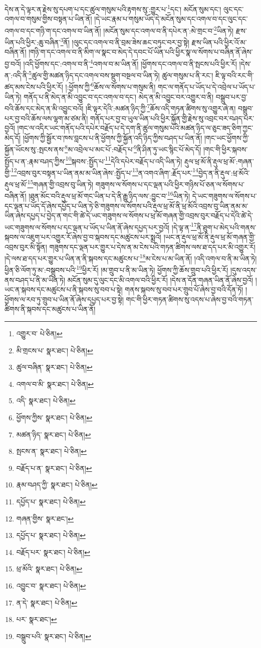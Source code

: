 དེས་ན་དེ་ལྟར་ན་རྗེས་སུ་དཔག་པ་དང་ཚུལ་གསུམ་པའི་རྟགས་སུ་:གྱུར་པ་\footnote{འགྱུར་བ་  པེ་ཅིན། }དང་། མངོན་སུམ་དང་། ལུང་དང་འགལ་བ་གསུམ་གྱིས་བསྟན་པ་ཡིན་ནོ། །དེ་ཡང་རྣམ་པ་གསུམ་ཡོད་དེ་མངོན་སུམ་དང་འགལ་བ་དང་ལུང་དང་འགལ་བ་དང་གཉི་ག་དང་འགལ་བ་ཡིན་ནོ། །མངོན་སུམ་དང་འགལ་བ་ནི་དཔེར་ན་:མེ་གྲང་བ་\footnote{མི་གྲངས་པ་  སྣར་ཐང་།  པེ་ཅིན། }ཡིན་ཏེ། རྫས་ཡིན་པའི་ཕྱིར་:ཆུ་བཞིན་\footnote{ཚུལ་བཞིན་  སྣར་ཐང་།  པེ་ཅིན། }ནོ། །ལུང་དང་འགལ་བ་ནི་བྲམ་ཟེས་ཆང་བཏུང་བར་བྱ་སྟེ། རྫས་ཡིན་པའི་ཕྱིར་འོ་མ་བཞིན་ནོ། །གཉི་ག་དང་འགལ་བ་ནི་མིག་ལ་སྣང་བ་མེད་དེ་དབང་པོ་ཡིན་པའི་ཕྱིར་སྣ་ལ་སོགས་པ་བཞིན་ནོ་ཞེས་བྱ་བའོ། །འདི་ཕྱོགས་དང་:འགལ་བ་ནི་\footnote{འགལ་བ་མི་  སྣར་ཐང་།  པེ་ཅིན། }འགལ་བ་མ་ཡིན་ནོ། །ཕྱོགས་དང་འགལ་བ་ནི་སྤངས་པའི་ཕྱིར་རོ། །དེས་ན་:འདི་ནི་\footnote{འདི་  སྣར་ཐང་།  པེ་ཅིན། }ཚུལ་གྱི་མཚན་ཉིད་དང་འགལ་བས་སྡུག་བསྔལ་བ་ཡིན་ཏེ། ཚུལ་གསུམ་པ་ནི་རང་། ཇི་ལྟ་བའི་རང་གི་ཚད་མས་ངེས་པའི་ཕྱིར་རོ། །:ཕྱོགས་ཀྱི་\footnote{ཕྱོགས་ཀྱིས་  སྣར་ཐང་།  པེ་ཅིན། }ཆོས་ལ་སོགས་པ་གསུམ་ནི། གང་ལ་གནོད་པ་ཡོད་པ་དེ་འབྲེལ་པ་ཡོད་པ་ཡིན་ཏེ། གནོད་པ་ནི་མེད་ན་མི་འབྱུང་བ་དང་འགལ་བ་དང་། མེད་ན་མི་འབྱུང་བར་འགྱུར་བ་ནི། བསྒྲུབ་པར་བྱ་བའི་ཆོས་དང་མེད་ན་མི་འབྱུང་བའོ། །ཇི་ལྟར་དེའི་:མཚན་ཉིད་ཀྱི་\footnote{མཚན་ཉིད་  སྣར་ཐང་།  པེ་ཅིན། }ཆོས་འདི་གཏན་ཚིགས་སུ་འགྱུར་ཞེ་ན། བསྒྲུབ་པར་བྱ་བའི་ཆོས་ལས་ལྷག་མ་ཙམ་ནི། གནོད་པར་བྱ་བ་ཡུལ་ཡིན་པའི་ཕྱིར་སྐྱོན་གྱི་རྗེས་སུ་འབྲང་བར་བཤད་པར་བྱའོ། །གང་ལ་འདིར་ཡང་གནོད་པའི་དཔེར་བརྗོད་པ་དེ་དག་ནི་ཚུལ་གསུམ་པའི་མཚན་ཉིད་ལ་ཅུང་ཟད་ཅིག་ཀྱང་མེད་དོ། །ཕྱོགས་ཀྱི་སྦྱོར་བ་ཁས་བླངས་པ་ནི་ཕྱོགས་ཀྱི་སྐྱོན་འདི་ཉིད་ཀྱིས་བཤད་པ་ཡིན་ནོ། །གང་ཡང་ཕྱོགས་ཀྱི་སྐྱོན་ཡོངས་སུ་:སྤངས་ནས་\footnote{སྤངས་ན་  སྣར་ཐང་།  པེ་ཅིན། }མ་འབྲེལ་པ་མང་པོ་:བརྗོད་པ་\footnote{བརྗོད་པ་ན་  སྣར་ཐང་།  པེ་ཅིན། }ནི་ཤིན་ཏུ་ཡང་སྙིང་པོ་མེད་དོ། །གང་གི་ཕྱིར་སྐབས་སྤྱོད་པ་ན་:རྣམ་བཤད་ཀྱིས་\footnote{རྣམ་བཤད་ཀྱི་  སྣར་ཐང་།  པེ་ཅིན། }སྐབས་:སྤྱོད་པ་\footnote{དཔྱོད་པ་  སྣར་ཐང་།  པེ་ཅིན། }དེའི་དཔེར་བརྗོད་པ་འདི་ཡིན་ཏེ། རྡུལ་ཕྲ་མོ་ནི་རྡུལ་ཕྲ་མོ་:གཞན་གྱི་\footnote{གཞན་གྱིས་  སྣར་ཐང་། }འབྲས་བུར་བསྟན་པ་ཡིན་ནམ་མ་ཡིན་ཞེས་:སྤྱོད་པ་\footnote{དཔྱོད་པ་  སྣར་ཐང་།  པེ་ཅིན། }ན་འགའ་ཞིག་:རྗོད་པར་\footnote{བརྗོད་པར་  སྣར་ཐང་།  པེ་ཅིན། }བྱེད་ན་ནི་རྡུལ་:ཕྲ་མོའི་རྡུལ་ཕྲ་མོ་\footnote{ཕྲ་མོའི་  སྣར་ཐང་།  པེ་ཅིན། }གཞན་གྱི་འབྲས་བུ་ཡིན་ཏེ། གཟུགས་ལ་སོགས་པ་དང་ལྡན་པའི་ཕྱིར་གཉིས་པོ་ཅན་ལ་སོགས་པ་བཞིན་ནོ། །ཐུན་མོང་བའི་རྡུལ་ཕྲ་མོ་གང་ཡིན་པ་དེ་ནི་རྒྱུ་ཉིད་ལས་:བྱུང་བ་\footnote{འབྱུང་བ་  སྣར་ཐང་།  པེ་ཅིན། }ཡིན་ཏེ། དེ་ཡང་གཟུགས་ལ་སོགས་པ་དང་ལྡན་པ་ཡོད་དོ་ཞེས་དཔྱོད་པ་ཡིན་ཏེ་ཅི་གཟུགས་ལ་སོགས་པའི་རྡུལ་ཕྲ་མོ་ནི་ཕྲ་མོའི་འབྲས་བུ་ཡིན་ནམ་མ་ཡིན་ཞེས་དཔྱད་པ་བྱེད་ན་གང་གི་ཚེ་དེ་ཡང་གཟུགས་ལ་སོགས་པ་ཕྲ་མོ་གཞན་གྱི་འབྲས་བུར་བརྗོད་པ་དེའི་ཚེ་དེ་ཡང་གཟུགས་ལ་སོགས་པ་དང་ལྡན་པ་ཡོད་པ་ཡིན་ནོ་ཞེས་དཔྱད་པར་བྱའོ། །དེ་ལྟ་ན་\footnote{ན་དེ་  སྣར་ཐང་།  པེ་ཅིན། }ནི་ཐུག་པ་མེད་པའི་གནས་སྐབས་ལ་འཇུག་པར་འགྱུར་རོ་ཞེས་བྱ་བ་སྐབས་དང་མཚུངས་པར་སྨྲའོ། །ཡང་ན་རྡུལ་ཕྲ་མོ་ནི་རྡུལ་ཕྲ་མོ་གཞན་གྱི་འབྲས་བུར་མི་སྟོན། གཟུགས་དང་ལྡན་པར་གྱུར་པ་དེས་ན་མ་ངེས་པའི་གཏན་ཚིགས་ལས་ཐ་དད་པར་མི་འགྱུར་རོ། །དེ་ལས་ཐ་དད་པར་གྱུར་པ་ཡིན་ན་ནི་སྐབས་དང་མཚུངས་པ་\footnote{པར་  སྣར་ཐང་། }མ་ངེས་པ་མ་ཡིན་ནོ། །འདི་འགལ་བ་ནི་མ་ཡིན་ཏེ། ཕྱིན་ཅི་ལོག་ཏུ་མ་:བསྒྲུབས་པའི་\footnote{བསྒྲུབ་པའི་  སྣར་ཐང་།  པེ་ཅིན། }ཕྱིར་རོ། །མ་གྲུབ་པ་ནི་མ་ཡིན་ཏེ། ཕྱོགས་ཀྱི་ཆོས་གྲུབ་པའི་ཕྱིར་རོ། །དུས་འདས་ནས་བཤད་པ་ནི་མ་ཡིན་ཏེ། མངོན་སུམ་དུ་ལུང་དང་མི་འགལ་བའི་ཕྱིར་རོ། །དེས་ན་དོན་གཞན་ཡིན་ནོ་ཞེས་བྱའོ། །ཡང་ན་སྐབས་དང་མཚུངས་པ་ནི་སྐབས་སུ་བབ་པ་སྟེ། གནས་སྐབས་སུ་བབ་པར་གྲུབ་པོ་ཞེས་བྱ་བའི་དོན་ཏོ། །ཕྱོགས་ལ་རབ་ཏུ་གྲུབ་པ་ཡིན་ནོ་ཞེས་དཔྱད་པར་བྱ་སྟེ། གང་གི་ཕྱིར་གཏན་ཚིགས་སུ་འདས་པ་ཞེས་བྱ་བའི་གཏན་ཚིགས་ནི་སྐབས་དང་མཚུངས་པ་ཡིན་ནོ། 